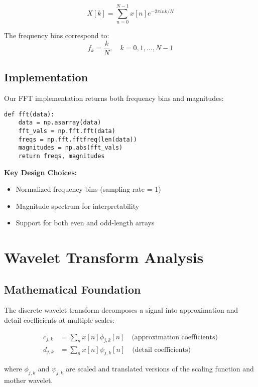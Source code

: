 \documentclass[11pt,a4paper]{article}
\begin{document}
\begin{equation}
X[k] = \sum_{n=0}^{N-1} x[n] e^{-2\pi i nk/N}
\end{equation}

The frequency bins correspond to:
\begin{equation}
f_k = \frac{k}{N}, \quad k = 0, 1, \ldots, N-1
\end{equation}

\subsection{Implementation}

Our FFT implementation returns both frequency bins and magnitudes:

\begin{lstlisting}
def fft(data):
    data = np.asarray(data)
    fft_vals = np.fft.fft(data)
    freqs = np.fft.fftfreq(len(data))
    magnitudes = np.abs(fft_vals)
    return freqs, magnitudes
\end{lstlisting}

\textbf{Key Design Choices:}
\begin{itemize}
    \item Normalized frequency bins (sampling rate = 1)
    \item Magnitude spectrum for interpretability
    \item Support for both even and odd-length arrays
\end{itemize}

\section{Wavelet Transform Analysis}

\subsection{Mathematical Foundation}

The discrete wavelet transform decomposes a signal into approximation and detail coefficients at multiple scales:

\begin{align}
c_{j,k} &= \sum_n x[n] \phi_{j,k}[n] \quad \text{(approximation coefficients)} \\
d_{j,k} &= \sum_n x[n] \psi_{j,k}[n] \quad \text{(detail coefficients)}
\end{align}

where $\phi_{j,k}$ and $\psi_{j,k}$ are scaled and translated versions of the scaling function and mother wavelet.
\end{document}
